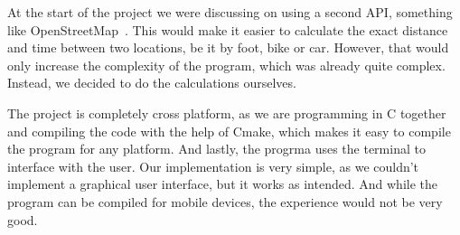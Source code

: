 At the start of the project we were discussing on using a second API, something like OpenStreetMap~\cite{openstreetmap}.
This would make it easier to calculate the exact distance and time between two locations, be it by foot, bike or car.
However, that would only increase the complexity of the program, which was already quite complex.
Instead, we decided to do the calculations ourselves.

The project is completely cross platform, as we are programming in C together and compiling the code with the help of
Cmake, which makes it easy to compile the program for any platform.
And lastly, the progrma uses the terminal to interface with the user.
Our implementation is very simple, as we couldn't implement a graphical user interface, but it works as intended.
And while the program can be compiled for mobile devices, the experience would not be very good.
